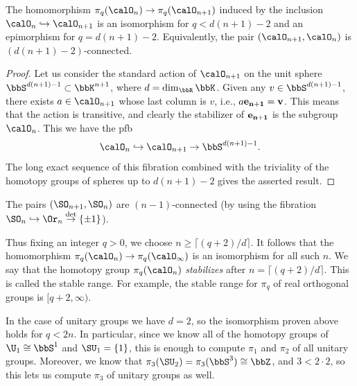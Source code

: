 \begin{prop}\label{prop 10.9.6 Shastri}
    The homomorphism $\pi_q(\calO_n)\to \pi_q(\calO_{n+1})$ induced by the inclusion $\calO_n\hookrightarrow \calO_{n+1}$  is an isomorphism for $q<d(n+1)-2$ and an epimorphism for $q=d(n+1)-2$. Equivalently, the pair $(\calO_{n+1},\calO_n)$ is $(d(n+1)-2)$-connected.
\end{prop}
\begin{proof}
    Let us consider the standard action of $\calO_{n+1}$ on the unit sphere $\bbS^{d(n+1)-1}\subset \bbK^{n+1}$, where $d=\dim_\bbR\bbK$. Given any $v\in \bbS^{d(n+1)-1}$, there exists $a\in\calO_{n+1}$ whose last column is $v$, i.e., $ a\bf{e}_{n+1}=v$. This means that the action is transitive, and clearly the stabilizer of $\bf{e}_{n+1}$ is the subgroup $\calO_n$. This we have the \gls{pfb}
    \[\calO_n\hookrightarrow \calO_{n+1}\to \bbS^{d(n+1)-1}.\]
    The long exact sequence of this fibration combined with the triviality of the homotopy groups of spheres up to $d(n+1)-2$ gives the asserted result.
\end{proof}
\begin{cor}
    The pairs $(\SO_{n+1},\SO_n)$ are $(n-1)$-connected (by using the fibration $\SO_n\hookrightarrow \Or_n\overset{\det}{\to}\{\pm 1\}$).
\end{cor}
\begin{rem}
    Thus fixing an integer $q>0$, we choose $n\geq \lceil (q+2)/d\rceil$. It follows that the homomorphism $\pi_q(\calO_n)\to \pi_q(\calO_\infty)$ is an isomorphism for all such $n$. We say that the homotopy group $\pi_q(\calO_n)$ \emph{stabilizes} after $n=\lceil (q+2)/d\rceil$. This is called the stable range. For example, the stable range for $\pi_q$ of real orthogonal groups is $[q+2,\infty)$.
\end{rem}

In the case of unitary groups we have $d=2$, so the isomorphism proven above holds for $q<2n$. In particular, since we know all of the homotopy groups of $\U_1\cong \bbS^1$ and $\SU_1=\{1\}$, this is enough to compute $\pi_1$ and $\pi_2$ of all unitary groups. Moreover, we know that $\pi_3(\SU_2)=\pi_3(\bbS^3)\cong\bbZ$, and $3<2\cdot 2$, so this lets us compute $\pi_3$ of unitary groups as well. 

